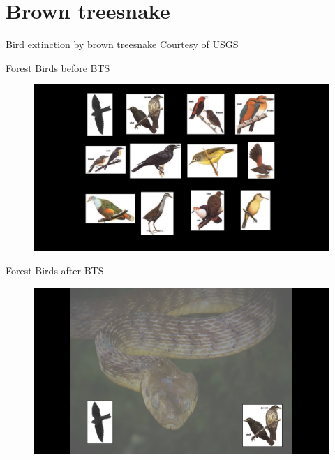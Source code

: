\documentclass[]{beamer}
\begin{document}
\section*{Brown treesnake}

\begin{frame}{Bird extinction by brown treesnake}
    \tiny{Courtesy of USGS}
\end{frame}

\begin{frame}{Forest Birds before BTS}
	\begin{figure}
		\includegraphics[height=0.8\textheight]{birds-before-bts.png}
	\end{figure}
\end{frame}

\begin{frame}{Forest Birds after BTS}
	\begin{figure}
		\includegraphics[height=0.8\textheight]{birds-after-bts.png}
	\end{figure}
\end{frame}
\end{document}
